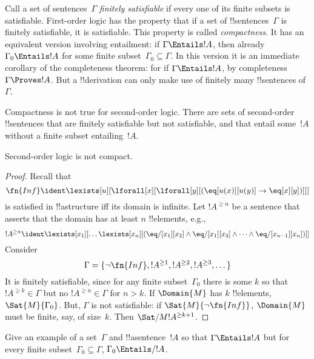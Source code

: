 \documentclass[../../../include/open-logic-section]{subfiles}
\begin{document}


\begin{explain}
Call a set of sentences~$\Gamma$ \emph{finitely satisfiable} if every
one of its finite subsets is satisfiable.  First-order logic has the
property that if a set of !!{sentence}s~$\Gamma$ is finitely
satisfiable, it is satisfiable.  This property is called
\emph{compactness}.  It has an equivalent version involving
entailment: if $\Gamma \Entails !A$, then already $\Gamma_0 \Entails
!A$ for some finite subset~$\Gamma_0 \subseteq \Gamma$. In this
version it is an immediate corollary of the completeness theorem: for
if $\Gamma \Entails !A$, by completeness $\Gamma \Proves !A$. But a
!!{derivation} can only make use of finitely many !!{sentence}s
of~$\Gamma$.

Compactness is not true for second-order logic. There are sets of
second-order !!{sentence}s that are finitely satisfiable but not
satisfiable, and that entail some~$!A$ without a finite subset
entailing~$!A$.  
\end{explain}


\begin{thm}
Second-order logic is not compact.
\end{thm}

\begin{proof}
Recall that 
\[
\fn{Inf} \ident \lexists[u][\lforall[x][\lforall[y][(\eq[u(x)][u(y)]
      \to \eq[x][y])]]]
\]
is satisfied in !!a{structure} iff its domain is infinite. Let
$!A^{\ge n}$ be a sentence that asserts that the domain has at least
$n$ !!{element}s, e.g.,
\[
!A^{\ge n} \ident \lexists[x_1][\dots\lexists[x_n][(\eq/[x_1][x_2]
    \land \eq/[x_1][x_3] \land \dots \land \eq/[x_{n-1}][x_n])]]
\]
Consider
\[
\Gamma = \{\lnot \fn{Inf}, !A^{\ge 1}, !A^{\ge 2}, !A^{\ge 3}, \dots\}
\]
It is finitely satisfiable, since for any finite subset~$\Gamma_0$
there is some $k$ so that $!A^{\ge k} \in \Gamma$ but no $!A^{\ge n}
\in \Gamma$ for $n>k$. If $\Domain{M}$ has $k$ !!{element}s,
$\Sat{M}{\Gamma_0}$. But, $\Gamma$ is not satisfiable: if
$\Sat{M}{\lnot \fn{Inf}}$, $\Domain{M}$ must be finite, say, of
size~$k$. Then $\Sat/{M}{!A^{\ge k+1}}$.
\end{proof}

\begin{prob}
Give an example of a set~$\Gamma$ and !!a{sentence}~$!A$ so that
$\Gamma \Entails !A$ but for every finite subset~$\Gamma_0 \subseteq
\Gamma$, $\Gamma_0 \Entails/ !A$.
\end{prob}
\end{document}

